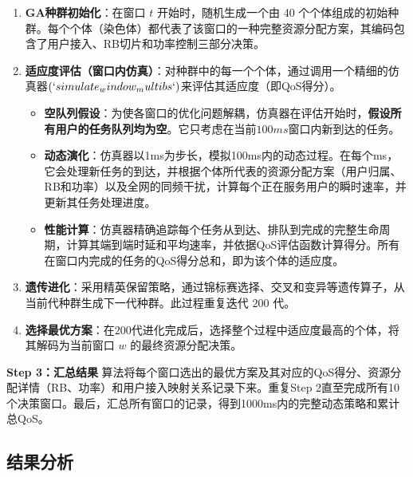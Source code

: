 \begin{enumerate}
    \item \textbf{GA种群初始化}：在窗口 $t$ 开始时，随机生成一个由 40 个个体组成的初始种群。每个个体（染色体）都代表了该窗口的一种完整资源分配方案，其编码包含了用户接入、RB切片和功率控制三部分决策。

    \item \textbf{适应度评估（窗口内仿真）}：对种群中的每一个个体，通过调用一个精细的仿真器$(`simulate_window_multibs`)$来评估其适应度（即QoS得分）。
    \begin{itemize}
        \item \textbf{空队列假设}：为使各窗口的优化问题解耦，仿真器在评估开始时，\textbf{假设所有用户的任务队列均为空}。它只考虑在当前$100ms$窗口内新到达的任务。
        \item \textbf{动态演化}：仿真器以1ms为步长，模拟100ms内的动态过程。在每个ms，它会处理新任务的到达，并根据个体所代表的资源分配方案（用户归属、RB和功率）以及全网的同频干扰，计算每个正在服务用户的瞬时速率，并更新其任务处理进度。
        \item \textbf{性能计算}：仿真器精确追踪每个任务从到达、排队到完成的完整生命周期，计算其端到端时延和平均速率，并依据QoS评估函数计算得分。所有在窗口内完成的任务的QoS得分总和，即为该个体的适应度。
    \end{itemize}

    \item \textbf{遗传进化}：采用精英保留策略，通过锦标赛选择、交叉和变异等遗传算子，从当前代种群生成下一代种群。此过程重复迭代 $200$ 代。

    \item \textbf{选择最优方案}：在$200$代进化完成后，选择整个过程中适应度最高的个体，将其解码为当前窗口 $w$ 的最终资源分配决策。
\end{enumerate}

\textbf{Step 3：汇总结果}
算法将每个窗口选出的最优方案及其对应的QoS得分、资源分配详情（RB、功率）和用户接入映射关系记录下来。重复Step 2直至完成所有10个决策窗口。最后，汇总所有窗口的记录，得到1000ms内的完整动态策略和累计总QoS。


\subsection{结果分析}

